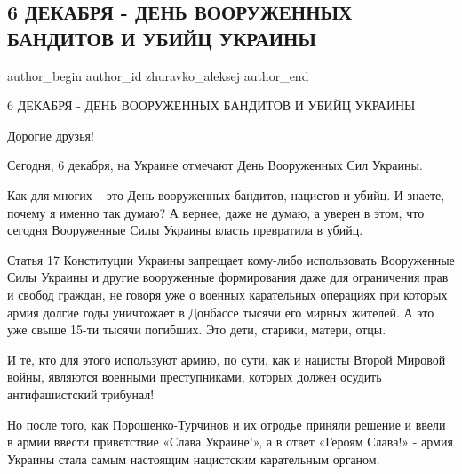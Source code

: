  
 
 
 
 
 
\subsection{6 ДЕКАБРЯ - ДЕНЬ ВООРУЖЕННЫХ БАНДИТОВ И УБИЙЦ УКРАИНЫ}
\label{sec:06_12_2021.fb.zhuravko_aleksej.1.den_vsu}
 
\ifcmt
 author_begin
   author_id zhuravko_aleksej
 author_end
\fi

6 ДЕКАБРЯ - ДЕНЬ ВООРУЖЕННЫХ БАНДИТОВ И УБИЙЦ УКРАИНЫ

Дорогие друзья!

Сегодня, 6 декабря, на Украине отмечают День Вооруженных Сил Украины.

Как для многих – это День вооруженных бандитов, нацистов и убийц. И знаете,
почему я именно так думаю? А вернее, даже не думаю, а уверен в этом, что
сегодня Вооруженные Силы Украины власть превратила в убийц.


Статья 17 Конституции Украины запрещает кому-либо использовать Вооруженные Силы
Украины и другие вооруженные формирования даже для ограничения прав и свобод
граждан, не говоря уже о военных карательных операциях при которых армия долгие
годы уничтожает в Донбассе тысячи его мирных жителей. А это уже свыше 15-ти
тысячи погибших. Это дети, старики, матери, отцы.

И те, кто для этого используют армию, по сути, как и нацисты Второй Мировой
войны, являются военными преступниками, которых должен осудить антифашистский
трибунал!

Но после того, как Порошенко-Турчинов и их отродье приняли решение и ввели в
армии ввести приветствие «Слава Украине!», а в ответ «Героям Слава!» - армия
Украины стала самым настоящим нацистским карательным органом. 

